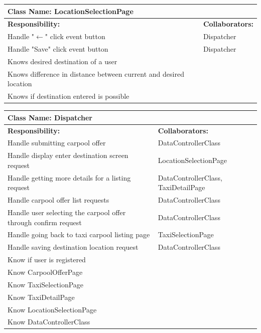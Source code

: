\documentclass[]{article}
\begin{document}
	\begin{table}[H]
	\centering
	\begin{tabular}{|p{6cm}|p{6cm}|}
	\hline 
		\multicolumn{2}{|l|}{\textbf{Class Name: LocationSelectionPage}} \\
	\hline
	\textbf{Responsibility:} & \textbf{Collaborators:} \\
	\hline
	Handle "$\xleftarrow{}$" click event button & Dispatcher \\ \hline
	Handle "Save" click event button & Dispatcher\\ \hline
	Knows desired destination of a user & \\ \hline
	Knows difference in distance between current and desired location & \\ \hline
	Knows if destination entered is possible & \\ \hline
	\end{tabular}
	\end{table}
	
	\begin{table}[H]
	\centering
	\begin{tabular}{|p{6cm}|p{6cm}|}
	\hline 
		\multicolumn{2}{|l|}{\textbf{Class Name: Dispatcher}} \\
	\hline
	\textbf{Responsibility:} & \textbf{Collaborators:} \\
	\hline
	Handle submitting carpool offer & DataControllerClass\\ \hline
	Handle display enter destination screen request & LocationSelectionPage\\ \hline
	Handle getting more details for a listing request & DataControllerClass, TaxiDetailPage\\ \hline
	Handle carpool offer list requests & DataControllerClass\\ \hline
	Handle user selecting the carpool offer through confirm request & DataControllerClass\\ \hline 
	Handle going back to taxi carpool listing page & TaxiSelectionPage\\ \hline
	Handle saving destination location request & DataControllerClass\\ \hline
	Know if user is registered & \\ \hline
	Know CarpoolOfferPage & \\ \hline 
	Know TaxiSelectionPage & \\ \hline
	Know TaxiDetailPage & \\ \hline
	Know LocationSelectionPage & \\ \hline
	Know DataControllerClass & \\ \hline
	\end{tabular}
	\end{table}
	
\end{document}
